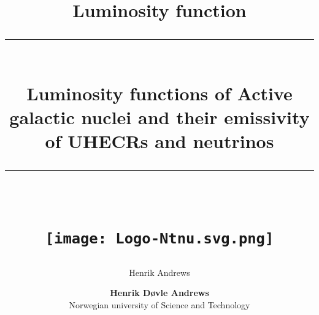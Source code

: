 \documentclass[11pt]{article}
\title{Luminosity function}
\author{Henrik Andrews}
\newcommand{\HRule}[1]{\rule{\linewidth}{#1}}
\begin{document}
\title{ \normalsize
	\HRule{0.5pt} \\
	\LARGE \textbf{{Luminosity functions of Active galactic nuclei and their emissivity of UHECRs and neutrinos}}	
	\\
	\HRule{2pt} \\ [0.5cm]		
	\vspace{6cm}
	\begin{figure}[htp]
    \centering
    \texttt{[image: Logo-Ntnu.svg.png]}
    \end{figure}
	}

\author{
    \normalsize 
	\textbf{Henrik Døvle Andrews } \\
	Norwegian university of Science and Technology \\ 
}

\maketitle
\setcounter{page}{ 0 }

\newpage

\pagestyle{fancy}
\fancyhf{}
\setlength\headheight{14pt}
\fancyhead[R]{\leftmark}
\setcounter{page}{1}


\maketitle
\end{document}
